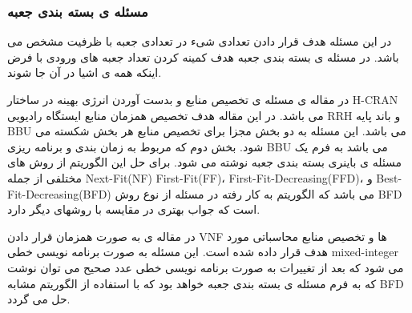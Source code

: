 \subsubsection{مسئله ی بسته بندی جعبه}
 در این مسئله هدف قرار دادن تعدادی شیء در تعدادی جعبه با ظرفیت مشخص می باشد.
در مسئله ی بسته بندی جعبه 
هدف کمینه کردن تعداد جعبه های ورودی با فرض اینکه همه ی اشیا در آن جا شوند.

در مقاله ی
\citep{wang2017joint}
مسئله ی تخصیص منابع و بدست آوردن انرژی بهینه در ساختار
H-CRAN
می باشد.
در این مقاله هدف تخصیص همزمان منابع ایستگاه رادیویی RRH و باند پایه BBU می باشد.
این مسئله به دو بخش مجزا برای تخصیص منابع هر بخش شکسته می شود.
بخش دوم که مربوط به زمان بندی و برنامه ریزی BBU می باشد به فرم یک مسئله ی باینری بسته بندی جعبه نوشته می شود.
برای حل این الگوریتم از روش های مختلفی از جمله
Next-Fit(NF)
First-Fit(FF)،
First-Fit-Decreasing(FFD)،
و
‌Best-Fit-Decreasing(BFD)
می باشد که الگوریتم به کار رفته در مسئله از نوع روش
BFD 
 است که جواب بهتری در مقایسه با روشهای دیگر دارد.  
 
در مقاله ی
\cite{de2020optimal}
به صورت همزمان قرار دادن VNF ها و تخصیص منابع محاسباتی مورد هدف قرار داده شده است.
این مسئله به صورت
برنامه نویسی خطی 
mixed-integer
می شود که بعد از تغییرات به صورت برنامه نویسی خطی عدد صحیح می توان نوشت که به فرم مسئله ی بسته بندی جعبه خواهد بود که با استفاده از الگوریتم مشابه
BFD حل می گردد.
